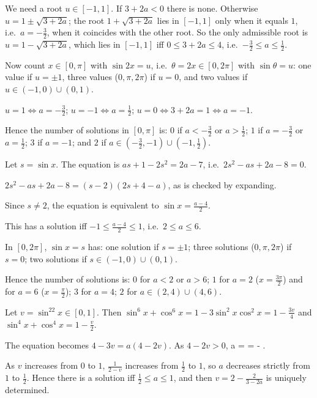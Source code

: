   We need a root $u\in[-1, 1]$. If $3 + 2a < 0$ there is none. Otherwise $u = 1\pm\sqrt{3 + 2a}$; the root $1 +
  \sqrt{3 + 2a}$ lies in $[-1, 1]$ only when it equals $1$, i.e.\ $a = -\frac{3}{2}$, when it coincides with the
  other root. So the only admissible root is $u = 1 - \sqrt{3 + 2a}$, which lies in $[-1, 1]$ iff $0\le 3 + 2a\le
  4$, i.e.\ $-\frac{3}{2}\le a\le\frac{1}{2}$.

  Now count $x\in[0, \pi]$ with $\sin2x = u$, i.e.\ $\theta = 2x\in[0, 2\pi]$ with $\sin\theta = u$: one value if
  $u = \pm1$, three values ($0, \pi, 2\pi$) if $u = 0$, and two values if $u\in(-1, 0)\cup(0, 1)$.

  $u = 1\Leftrightarrow a = -\frac{3}{2}$; $u = -1\Leftrightarrow a = \frac{1}{2}$; $u = 0\Leftrightarrow 3 + 2a = 1
  \Leftrightarrow a = -1$.

  Hence the number of solutions in $[0, \pi]$ is: $0$ if $a < -\frac{3}{2}$ or $a > \frac{1}{2}$; $1$ if $a =
  -\frac{3}{2}$ or $a = \frac{1}{2}$; $3$ if $a = -1$; and $2$ if $a\in\left(-\frac{3}{2}, -1\right)\cup\left(-1,
  \frac{1}{2}\right)$.
\item Let $s = \sin x$. The equation is $as + 1 - 2s^2 = 2a - 7$, i.e.\ $2s^2 - as + 2a - 8 = 0$.

  $2s^2 - as + 2a - 8 = (s - 2)(2s + 4 - a)$, as is checked by expanding.

  Since $s\neq 2$, the equation is equivalent to $\sin x = \frac{a - 4}{2}$.

  This has a solution iff $-1\le\frac{a - 4}{2}\le 1$, i.e.\ $2\le a\le 6$.

  In $[0, 2\pi]$, $\sin x = s$ has: one solution if $s = \pm1$; three solutions ($0, \pi, 2\pi$) if $s = 0$; two
  solutions if $s\in(-1, 0)\cup(0, 1)$.

  Hence the number of solutions is: $0$ for $a < 2$ or $a > 6$; $1$ for $a = 2$ ($x = \frac{3\pi}{2}$) and for $a =
  6$ ($x = \frac{\pi}{2}$); $3$ for $a = 4$; $2$ for $a\in(2, 4)\cup(4, 6)$.
\item Let $v = \sin^22x\in[0, 1]$. Then $\sin^6x + \cos^6x = 1 - 3\sin^2x\cos^2x = 1 - \frac{3v}{4}$ and $\sin^4x +
  \cos^4x = 1 - \frac{v}{2}$.

  The equation becomes $4 - 3v = a(4 - 2v)$. As $4 - 2v > 0$,
  \startformula
    a =  =  - .
  \stopformula

  As $v$ increases from $0$ to $1$, $\frac{1}{2 - v}$ increases from $\frac{1}{2}$ to $1$, so $a$ decreases
  strictly from $1$ to $\frac{1}{2}$. Hence there is a solution iff $\frac{1}{2}\le a\le 1$, and then $v = 2 -
  \frac{2}{3 - 2a}$ is uniquely determined.

